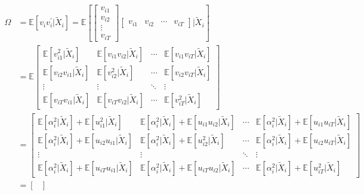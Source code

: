 \begin{align*}
    \Omega &= \mathbb{E}[v_i v_i^{\prime} | \tilde{X}_i] = \mathbb{E}\left[ \begin{bmatrix}
        v_{i1} \\
        v_{i2} \\
        \vdots \\
        v_{iT}
    \end{bmatrix} \begin{bmatrix}
        v_{i1} & v_{i2} & \cdots & v_{iT}
    \end{bmatrix} | \tilde{X}_i \right]\\
    &= \mathbb{E}\begin{bmatrix}
        \mathbb{E}[v_{i1}^2 | \tilde{X}_i] & \mathbb{E}[v_{i1}v_{i2} | \tilde{X}_i] & \cdots & \mathbb{E}[v_{i1}v_{iT} | \tilde{X}_i] \\
        \mathbb{E}[v_{i2}v_{i1} | \tilde{X}_i] & \mathbb{E}[v_{i2}^2 | \tilde{X}_i] & \cdots & \mathbb{E}[v_{i2}v_{iT} | \tilde{X}_i] \\
        \vdots & \vdots & \ddots & \vdots \\
        \mathbb{E}[v_{iT}v_{i1} | \tilde{X}_i] & \mathbb{E}[v_{iT}v_{i2} | \tilde{X}_i] & \cdots & \mathbb{E}[v_{iT}^2 | \tilde{X}_i]
    \end{bmatrix} \\
    &= \begin{bmatrix}
        \mathbb{E}\left[\alpha_i^2 | \tilde{X}_i \right] + \mathbb{E}[u_{i1}^2 | \tilde{X}_i] & \mathbb{E}\left[\alpha_i^2 | \tilde{X}_i \right] + \mathbb{E}[u_{i1}u_{i2} | \tilde{X}_i] & \cdots & \mathbb{E}\left[\alpha_i^2 | \tilde{X}_i \right] + \mathbb{E}[u_{i1}u_{iT} | \tilde{X}_i] \\
        \mathbb{E}\left[\alpha_i^2 | \tilde{X}_i \right] + \mathbb{E}[u_{i2}u_{i1} | \tilde{X}_i] & \mathbb{E}\left[\alpha_i^2 | \tilde{X}_i \right] + \mathbb{E}[u_{i2}^2 | \tilde{X}_i] & \cdots & \mathbb{E}\left[\alpha_i^2 | \tilde{X}_i \right] + \mathbb{E}[u_{i2}u_{iT} | \tilde{X}_i] \\
        \vdots & \vdots & \ddots & \vdots \\
        \mathbb{E}\left[\alpha_i^2 | \tilde{X}_i \right] + \mathbb{E}[u_{iT}u_{i1} | \tilde{X}_i] & \mathbb{E}\left[\alpha_i^2 | \tilde{X}_i \right] + \mathbb{E}[u_{iT}u_{i2} | \tilde{X}_i] & \cdots & \mathbb{E}\left[\alpha_i^2 | \tilde{X}_i \right] + \mathbb{E}[u_{iT}^2 | \tilde{X}_i]
    \end{bmatrix}\\
    &= \begin{bmatrix}

\end{bmatrix}
\end{align*}
